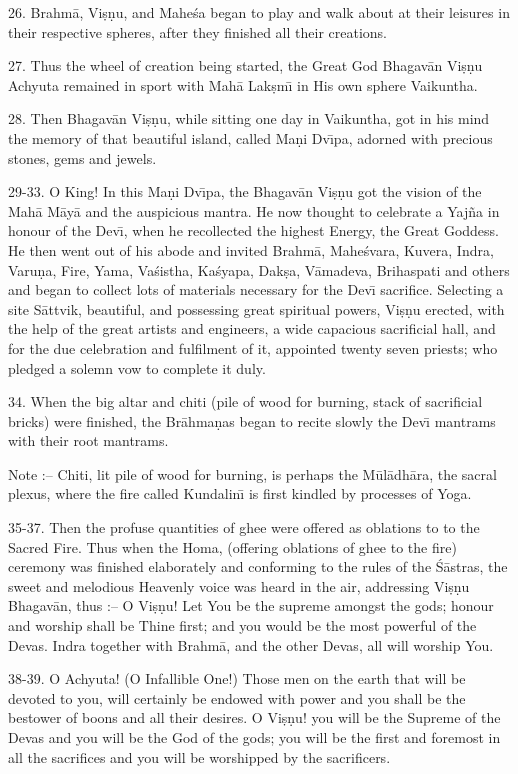 26. Brahm\=a, Vi\d{s}\d{n}u, and Mahe\'sa began to play and walk about at their leisures in their respective spheres, after they finished all their creations.

27. Thus the wheel of creation being started, the Great God Bhagav\=an Vi\d{s}\d{n}u Achyuta remained in sport with Mah\=a Lak\d{s}m\={\i} in His own sphere Vaikuntha.

28. Then Bhagav\=an Vi\d{s}\d{n}u, while sitting one day in Vaikuntha, got in his mind the memory of that beautiful island, called Ma\d{n}i Dv\={\i}pa, adorned with precious stones, gems and jewels.

29-33. O King! In this Ma\d{n}i Dv\={\i}pa, the Bhagav\=an Vi\d{s}\d{n}u got the vision of the Mah\=a M\=ay\=a and the auspicious mantra. He now thought to celebrate a Yaj\~na in honour of the Dev\={\i}, when he recollected the highest Energy, the Great Goddess. He then went out of his abode and invited Brahm\=a, Mahe\'svara, Kuvera, Indra, Varu\d{n}a, Fire, Yama, Va\'sistha, Ka\'syapa, Dak\d{s}a, V\=amadeva, Brihaspati and others and began to collect lots of materials necessary for the Dev\={\i} sacrifice. Selecting a site S\=attvik, beautiful, and possessing great spiritual powers, Vi\d{s}\d{n}u erected, with the help of the great artists and engineers, a wide capacious sacrificial hall, and for the due celebration and fulfilment of it, appointed twenty seven priests; who pledged a solemn vow to complete it duly.

34. When the big altar and chiti (pile of wood for burning, stack of sacrificial bricks) were finished, the Br\=ahma\d{n}as began to recite slowly the Dev\={\i} mantrams with their root mantrams.

Note :-- Chiti, lit pile of wood for burning, is perhaps the M\=ul\=adh\=ara, the sacral plexus, where the fire called Kundalin\={\i} is first kindled by processes of Yoga.

35-37. Then the profuse quantities of ghee were offered as oblations to to the Sacred Fire. Thus when the Homa, (offering oblations of ghee to the fire) ceremony was finished elaborately and conforming to the rules of the \'S\=astras, the sweet and melodious Heavenly voice was heard in the air, addressing Vi\d{s}\d{n}u Bhagav\=an, thus :-- O Vi\d{s}\d{n}u! Let You be the supreme amongst the gods; honour and worship shall be Thine first; and you would be the most powerful of the Devas. Indra together with Brahm\=a, and the other Devas, all will worship You.

38-39. O Achyuta! (O Infallible One!) Those men on the earth that will be devoted to you, will certainly be endowed with power and you shall be the bestower of boons and all their desires. O Vi\d{s}\d{n}u! you will be the Supreme of the Devas and you will be the God of the gods; you will be the first and foremost in all the sacrifices and you will be worshipped by the sacrificers.

